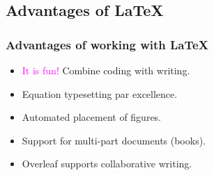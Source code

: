 \documentclass{beamer}
\newcommand{\heart}{\ensuremath\heartsuit}
\begin{document}
\subsection{ Advantages of \LaTeX}
\begin{frame}
\frametitle{Advantages of working with \LaTeX}
\begin{center}
\begin{Large}
\begin{itemize}[font=$\bullet$\scshape\bfseries]
\item \textcolor{magenta}{It is fun!} Combine coding with writing.
\item Equation typesetting par excellence.
\item Automated placement of figures.
\item Support for multi-part documents (books).
\item Overleaf supports collaborative writing.
\end{itemize}
\end{Large}
\end{center}
\end{frame}
\note{}


\end{document}
